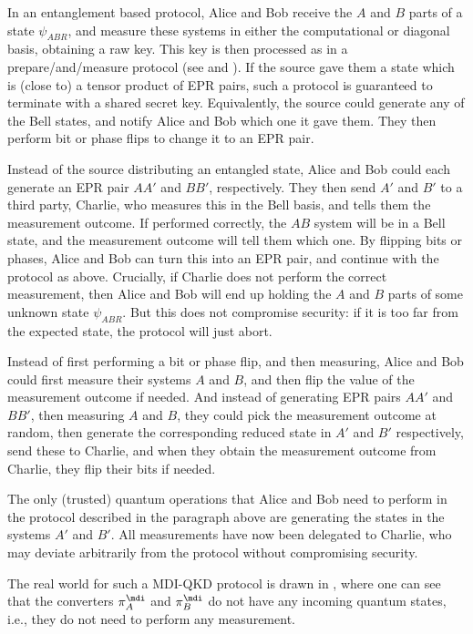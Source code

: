 In an entanglement based protocol, Alice and Bob receive the $A$ and
$B$ parts of a state $\psi_{ABR}$, and measure these systems in either
the computational or diagonal basis, obtaining a raw key. This key is
then processed as in a prepare\-/and\-/measure protocol (see
 and ).  If the
source gave them a state which is (close to) a tensor product of EPR
pairs, such a protocol is guaranteed to terminate with a shared secret
key. Equivalently, the source could generate any of the Bell states,
and notify Alice and Bob which one it gave them. They then perform bit
or phase flips to change it to an EPR pair.

Instead of the source distributing an entangled state, Alice and Bob
could each generate an EPR pair $AA'$ and $BB'$, respectively. They
then send $A'$ and $B'$ to a third party, Charlie, who measures this
in the Bell basis, and tells them the measurement outcome. If
performed correctly, the $AB$ system will be in a Bell state, and the
measurement outcome will tell them which one. By flipping bits or
phases, Alice and Bob can turn this into an EPR pair, and continue
with the protocol as above. Crucially, if Charlie does not perform the
correct measurement, then Alice and Bob will end up holding the $A$
and $B$ parts of some unknown state $\psi_{ABR}$. But this does not
compromise security: if it is too far from the expected state, the
protocol will just abort.

Instead of first performing a bit or phase flip, and then measuring,
Alice and Bob could first measure their systems $A$ and $B$, and then
flip the value of the measurement outcome if needed. And instead of
generating EPR pairs $AA'$ and $BB'$, then measuring $A$ and $B$, they
could pick the measurement outcome at random, then generate the
corresponding reduced state in $A'$ and $B'$ respectively, send these
to Charlie, and when they obtain the measurement outcome from Charlie,
they flip their bits if needed.

The only (trusted) quantum operations that Alice and Bob need to
perform in the protocol described in the paragraph above are
generating the states in the systems $A'$ and $B'$. All measurements
have now been delegated to Charlie, who may deviate arbitrarily from
the protocol without compromising security.

The real world for such a MDI-QKD protocol is drawn in
, where one can see that the converters
$\pi^{\mdi}_A$ and $\pi^{\mdi}_B$ do not have any incoming quantum
states, i.e., they do not need to perform any measurement.

